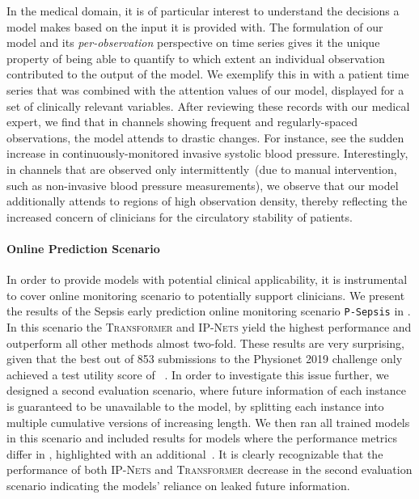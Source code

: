 \documentclass{article}
\newcommand{\dataset}[1]{\texttt{#1}}
\newcommand{\method}[1]{\textsc{#1}}
\begin{document}
In the medical domain, it is of particular interest to understand the decisions
a model makes based on the input it is provided with. The formulation of our
model and its \emph{per-observation} perspective on time series gives it the
unique property of being able to quantify to which extent an individual
observation contributed to the output of the model.
We exemplify this in  with a patient time
series that was combined with the attention values of our model, displayed for a set
of clinically relevant variables.
After reviewing these records with our medical expert, we find that in channels
showing frequent and regularly-spaced observations, the model attends to
drastic changes. For instance, see the sudden increase in continuously-monitored
invasive systolic blood pressure. Interestingly, in channels that are
observed only intermittently~(due to manual intervention, such as non-invasive
blood pressure measurements), we observe that our model additionally attends to
regions of high observation density, thereby reflecting the increased
concern of clinicians for the circulatory stability of patients.

\paragraph{Online Prediction Scenario}

In order to provide models with potential clinical applicability, it is
instrumental to cover online monitoring scenario to potentially support
clinicians. We present the results of the Sepsis early prediction online
monitoring scenario \dataset{P-Sepsis} in .
In this scenario the \method{Transformer} and \method{IP-Nets} yield the
highest performance and outperform all other methods almost two-fold.  These
results are very surprising, given that the best out of 853 submissions to the
Physionet 2019 challenge only achieved a test utility score of
~\citep{reyna2020early}.  In order to investigate this issue further, we
designed a second evaluation scenario, where future information of each
instance is guaranteed to be unavailable to the model, by splitting each
instance into multiple cumulative versions of increasing length.  We then ran
all trained models in this scenario and included results for models where the
performance metrics differ in , highlighted with an
additional~.
It is clearly recognizable that the performance of both \method{IP-Nets}
and \method{Transformer} decrease in the second evaluation scenario
indicating the models' reliance on leaked future information. 
\end{document}
